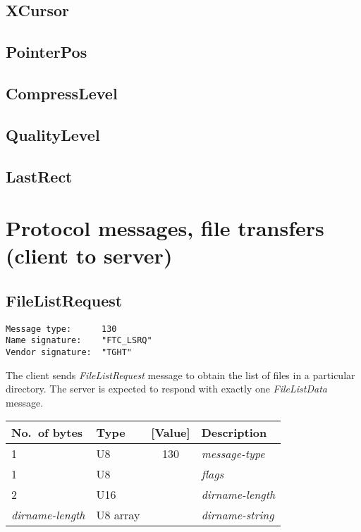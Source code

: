 \documentclass[a4paper]{article}
\newcommand{\typestr}[1]{\textit{#1}}
\begin{document}
\subsection{XCursor}
\subsection{PointerPos}
\subsection{CompressLevel}
\subsection{QualityLevel}
\subsection{LastRect}


\newpage
\section{Protocol messages, file transfers (client to server)}

\subsection{FileListRequest}
\begin{verbatim}
Message type:      130
Name signature:    "FTC_LSRQ"
Vendor signature:  "TGHT"
\end{verbatim}

The client sends \typestr{FileListRequest} message to obtain the list
of files in a particular directory. The server is expected to respond
with exactly one \typestr{FileListData} message.

\begin{tabular}{l|lc|l} \hline
No.\ of bytes & Type & [Value] & Description \\ \hline
1 & U8  & 130 & \typestr{message-type} \\
1 & U8  &     & \typestr{flags} \\
2 & U16 &     & \typestr{dirname-length} \\
\typestr{dirname-length} & U8 array & & \typestr{dirname-string} \\
\hline\end{tabular}
\end{document}
